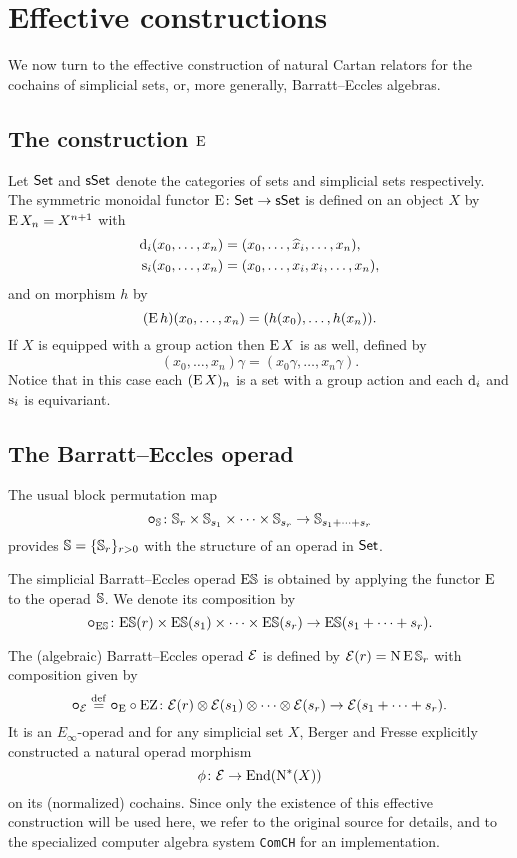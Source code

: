 
\section{Effective constructions}\label{s:effective}

We now turn to the effective construction of natural Cartan relators for the cochains of simplicial sets, or, more generally, Barratt--Eccles algebras.

\subsection{The construction $\operatorname{E}$}

Let $\mathsf{Set}$ and $\mathsf{sSet}$ denote the categories of sets and simplicial sets respectively.
The symmetric monoidal functor $\operatorname{E} \colon \mathsf{Set} \to \mathsf{sSet}$ is defined on an object $X$ by $\operatorname{E} X_n = X^{n+1}$ with
\[
\begin{split}
	\operatorname{d}_i(x_0,\dots,x_n) &= (x_0,\dots,\widehat{x}_i,\dots,x_n), \\
	\operatorname{s}_i(x_0,\dots,x_n) &= (x_0, \dots, x_i, x_i, \dots, x_n),
\end{split}
\]
and on morphism $h$ by
\[
(\operatorname{E} h)(x_0,\dots,x_n) = (h(x_0),\dots,h(x_n)).
\]
If $X$ is equipped with a group action then $\operatorname{E} X$ is as well, defined by
\[
(x_0,\dots,x_n) \gamma = (x_0 \gamma, \dots, x_n \gamma).
\]
Notice that in this case each $(\operatorname{E} X)_n$ is a set with a group action and each $\operatorname{d}_i$ and $\operatorname{s}_i$ is equivariant.

\subsection{The Barratt--Eccles operad}

The usual block permutation map
\[
\bm{\mathbin{\circ}}_{\mathbb{S}} \colon \mathbb{S}_r \times \mathbb{S}_{s_1} \times \cdots \times \mathbb{S}_{s_r} \to \mathbb{S}_{s_1+\dots+s_r}
\]
provides $\mathbb{S} = \{\mathbb{S}_r\}_{r>0}$ with the structure of an operad in $\mathsf{Set}$.

The simplicial Barratt--Eccles operad $\mathrm{E}\mathbb{S}$ is obtained by applying the functor $\operatorname{E}$ to the operad $\mathbb{S}$.
We denote its composition by
\[
\bm{\mathbin{\circ}}_{\mathrm{E}\mathbb{S}} \colon
\mathrm{E}\mathbb{S}(r) \times \mathrm{E}\mathbb{S}(s_1) \times\dots\times \mathrm{E}\mathbb{S}(s_r) \to
\mathrm{E}\mathbb{S}(s_1+\dots+s_r).
\]

The (algebraic) Barratt--Eccles operad $\mathcal{E}$ is defined by $\mathcal{E}(r) = \operatorname{N}\operatorname{E}\mathbb{S}_r$ with composition given by
\[
\bm{\mathbin{\circ}}_{\mathcal{E}} \stackrel{\mathrm{def}}{=} \bm{\mathbin{\circ}}_{\operatorname{E}} \mathbin{\circ} \operatorname{EZ} \colon \mathcal{E}(r) \otimes \mathcal{E}(s_1) \otimes\dotsb\otimes \mathcal{E}(s_r) \to \mathcal{E}(s_1+\dots+s_r).
\]
It is an $E_\infty$-operad and for any simplicial set $X$, Berger and Fresse \cite{berger2004combinatorial} explicitly constructed a natural operad morphism
\[
\phi \colon \mathcal{E} \to \mathrm{End}(\operatorname{N^{\ast}}(X))
\]
on its (normalized) cochains.
Since only the existence of this effective construction will be used here, we refer to the original source for details, and to the specialized computer algebra system \texttt{ComCH} for an implementation.

